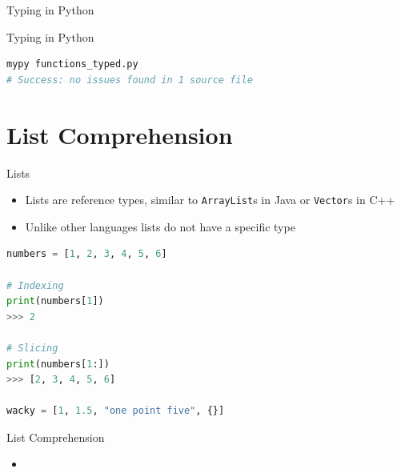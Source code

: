 \documentclass[aspectratio=169,xcolor=dvipsnames]{beamer}
\begin{document}

\begin{frame}[fragile]{Typing in Python}
  \begin{example}
    
  \end{example}
\end{frame}

\begin{frame}[fragile]{Typing in Python}
  \begin{example}
    \begin{lstlisting}[language=bash, otherkeywords={mypy}]
mypy functions_typed.py
# Success: no issues found in 1 source file
    \end{lstlisting}
  \end{example}
\end{frame}



\section{List Comprehension}

\begin{frame}[fragile]{Lists}
  \begin{itemize}
    \item Lists are reference types, similar to \texttt{ArrayList}s in Java or \texttt{Vector}s in C++
    \item Unlike other languages lists do not have a specific type
  \end{itemize}
  \begin{example}
    \begin{lstlisting}[language=Python]
numbers = [1, 2, 3, 4, 5, 6]

# Indexing
print(numbers[1])
>>> 2

# Slicing
print(numbers[1:])
>>> [2, 3, 4, 5, 6]

wacky = [1, 1.5, "one point five", {}]
    \end{lstlisting}
  \end{example}
\end{frame}


\begin{frame}{List Comprehension}
  \begin{itemize}
    \item
  \end{itemize}
\end{frame}
\end{document}
